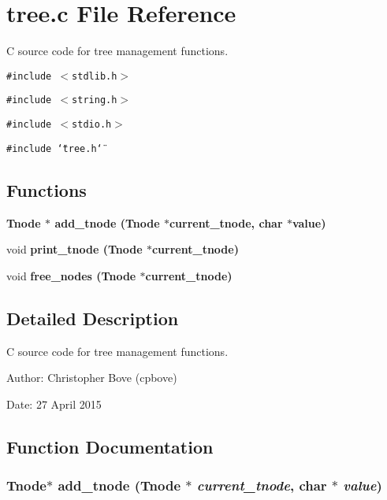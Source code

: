 \section{tree.c File Reference}
\label{tree_8c}
C source code for tree management functions. 

{\tt \#include $<$stdlib.h$>$}\par
{\tt \#include $<$string.h$>$}\par
{\tt \#include $<$stdio.h$>$}\par
{\tt \#include \char`\"{}tree.h\char`\"{}}\par
\subsection*{Functions}
\begin{CompactItemize}
\item 
\bf{Tnode} $\ast$ \bf{add\_\-tnode} (\bf{Tnode} $\ast$current\_\-tnode, char $\ast$value)
\item 
void \bf{print\_\-tnode} (\bf{Tnode} $\ast$current\_\-tnode)
\item 
void \bf{free\_\-nodes} (\bf{Tnode} $\ast$current\_\-tnode)
\end{CompactItemize}


\subsection{Detailed Description}
C source code for tree management functions. 

\begin{Desc}
\item[Author:]Christopher Bove (cpbove) \end{Desc}
\begin{Desc}
\item[Date:]27 April 2015 \end{Desc}


\subsection{Function Documentation}
\subsubsection{\setlength{\rightskip}{0pt plus 5cm}\bf{Tnode}$\ast$ add\_\-tnode (\bf{Tnode} $\ast$ {\em current\_\-tnode}, char $\ast$ {\em value})}\label{tree_8c_0e09ab427d9f10182d2261a14b349f66}


